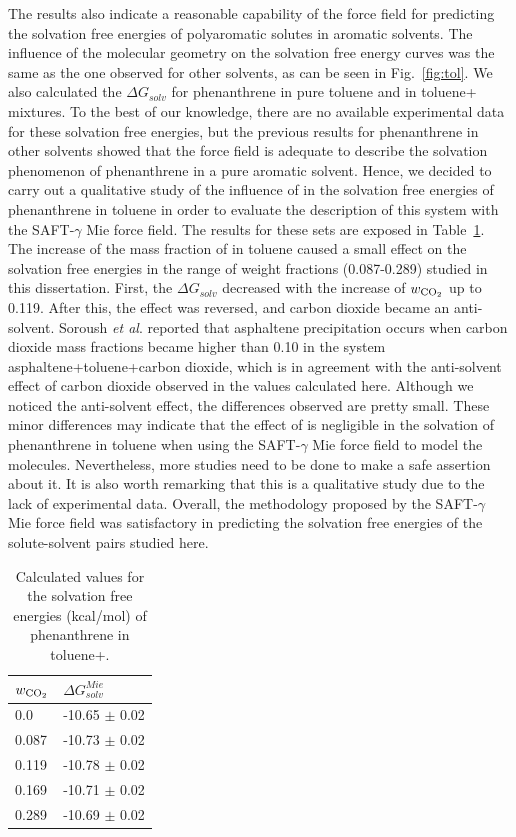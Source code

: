 \documentclass[final,12p,times,twocolumn]{elsarticle}
\begin{document}
	The results also indicate a reasonable capability of the force field for predicting the solvation free energies of polyaromatic solutes in aromatic solvents. The influence of the molecular geometry on the solvation free energy curves was the same as the one observed for other solvents, as can be seen in Fig.~\ref{fig:tol}.  We also calculated the $\Delta G_{solv}$ for phenanthrene in pure toluene and in toluene+ mixtures. To the best of our knowledge, there are no available experimental data for these solvation free energies, but the previous results for phenanthrene in other solvents showed that the force field is adequate to describe the solvation phenomenon of phenanthrene in a pure aromatic solvent. Hence, we decided to carry out a qualitative study of the influence of  in the solvation free energies of phenanthrene in toluene in order to evaluate the description of this system with the SAFT-$\gamma$ Mie force field. The results for these sets are exposed in Table~\ref{tbl:solvco2}. The increase of the mass fraction of  in toluene caused a small effect on the solvation free energies in the range of weight fractions (0.087-0.289) studied in this dissertation. First, the $\Delta G_{solv}$ decreased with the increase of $w_\text{\ce{CO_2}}$ up to 0.119. After this, the effect was reversed, and carbon dioxide became an anti-solvent. Soroush \textit{et al}. \cite{SOROUSH2014405} reported that asphaltene precipitation occurs when carbon dioxide mass fractions became higher than 0.10 in the system asphaltene+toluene+carbon dioxide, which is in agreement with the anti-solvent effect of carbon dioxide observed in the values calculated here. Although we noticed the anti-solvent effect, the differences observed are pretty small. These minor differences may indicate that the effect of  is negligible in the solvation of phenanthrene in toluene when using the SAFT-$\gamma$ Mie force field to model the molecules. Nevertheless, more studies need to be done to make a safe assertion about it. It is also worth remarking that this is a qualitative study due to the lack of experimental data. Overall, the methodology proposed by the SAFT-$\gamma$ Mie force field was satisfactory in predicting the solvation free energies of the solute-solvent pairs studied here.  
	
	\begin{table}
		\centering
		\caption{Calculated values for the solvation free energies (kcal/mol) of phenanthrene in toluene+.}
		\label{tbl:solvco2}
		\begin{tabular}{ll}
			\hline\hline
			$w_\text{\ce{CO_2}}$ & $\Delta G_{solv}^{Mie}$ \\ \hline
			0.0          & -10.65 $\pm$ 0.02       \\
			0.087        & -10.73 $\pm$ 0.02       \\
			0.119        & -10.78 $\pm$ 0.02       \\
			0.169        & -10.71 $\pm$ 0.02       \\
			0.289        & -10.69 $\pm$ 0.02       \\ \hline\hline
		\end{tabular}
	\end{table}
	
\end{document}

